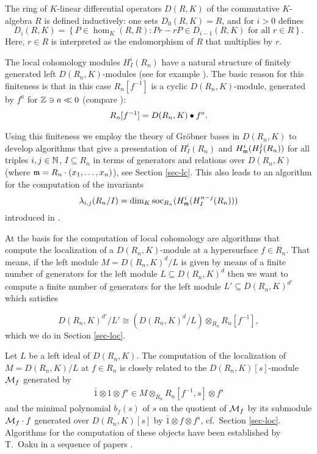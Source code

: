 The ring of $K$-linear differential operators $D(R,K)$ of the
commutative $K$-algebra $R$ is defined inductively: one sets
$D_0(R,K)=R$, and for $i>0$ defines 
\[
D_i(R,K)=\left\{P\in\hom_K(R,R):Pr-rP\in D_{i-1}(R,K) \text{ for all } r\in
R\right\}.
\]
Here, $r\in R$ is interpreted as the endomorphism of $R$ that
multiplies by $r$.

The local cohomology
modules $H^i_I(R_n)$ have a natural
structure of finitely generated left $D(R_n,K)$-modules (see for
example \cite{DM:K2,DM:L-Dmod}).
The basic reason for  this finiteness is that in this case 
$R_n[f^{-1}]$ is a cyclic
$D(R_n,K)$-module, generated by $f^{a}$ for ${\mathbb Z}\ni a\ll 0$
(compare \cite{DM:B}): 
\begin{eqnarray}
\label{eqn-loc-iso}
R_n[f^{-1}]=D(R_n,K)\bullet f^{a}.
\end{eqnarray}

Using 
this finiteness we employ the theory of
Gr\"obner bases in $D(R_n,K)$
to develop 
algorithms that give a presentation of $H^i_I(R_n)$ and $H^i_{\mathfrak m} (H^j_I(R_n))$
for all triples  $i,j\in {\mathbb N}$, $I\subseteq R_n$ in terms of generators and
relations over 
$D(R_n,K)$ (where ${\mathfrak m}=R_n\cdot(x_1,\ldots,x_n)$), see Section \ref{sec-lc}. 
This also leads to an
algorithm for the computation of the invariants 
\[
\lambda_{i,j}(R_n/I)=\dim_K\operatorname{soc}_{R_n}(H^i_{\mathfrak m}(H^{n-j}_I(R_n)))
\]
introduced in
\cite{DM:L-Dmod}.


At the basis for the computation of local cohomology are algorithms that
compute the localization of a $D(R_n,K)$-module at a hypersurface $f\in
R_n$. That means, if the left module $M={D(R_n,K)}^d/L$ is given by means of a
finite number of generators for the left module $L\subseteq {D(R_n,K)}^d$
then we want to compute a finite number of generators for the left
module $L'\subseteq {D(R_n,K)}^{d'}$ which satisfies

\[
{D(R_n,K)}^{d'}/L'\cong 
({D(R_n,K)}^d/L)\otimes_{R_n}R_n[f^{-1}]
,
\]
which we do in Section \ref{sec-loc}.  

Let $L$ be a left ideal of $D(R_n,K)$. 
The computation of the localization of 
$M=D(R_n,K)/L$ at $f\in R_n$ is closely related to the
$D(R_n,K)[s]$-module ${\mathcal M}_f$ generated by 
\begin{eqnarray}
\bar 1\otimes 1\otimes f^s\in M\otimes_{R_n} R_n[f^{-1},s]\otimes f^s
\end{eqnarray}
and the minimal polynomial $b_f(s)$ 
of $s$ on the quotient of ${\mathcal M}_f$ by its submodule ${\mathcal M}_f\cdot f$
generated over $D(R_n,K)[s]$ by $\bar 1\otimes f\otimes f^s$,  
 cf.\ Section \ref{sec-loc}. 
Algorithms for the computation of these objects have been
established by T.\ Oaku in a sequence of papers
\cite{DM:Oa,DM:Oa3,DM:Oa2}.

